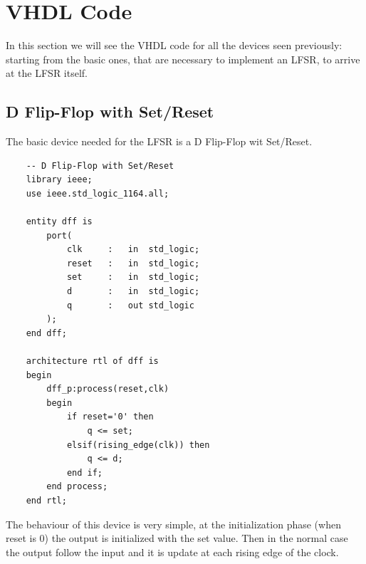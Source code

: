 \documentclass[a4paper]{report}
\begin{document}
\chapter{VHDL Code}
In this section we will see the VHDL code for all the devices seen previously: starting from the basic ones, that are necessary to implement an LFSR, to arrive at the LFSR itself.
\section{D Flip-Flop with Set/Reset}
The basic device needed for the LFSR is a D Flip-Flop wit Set/Reset.
\lstset{ %
	language=VHDL}
\begin{lstlisting}
	-- D Flip-Flop with Set/Reset
	library ieee;
	use ieee.std_logic_1164.all;
	
	entity dff is
		port(
			clk		:	in 	std_logic;
			reset	:	in 	std_logic;
			set 	:	in 	std_logic;
			d 		:	in 	std_logic;
			q 		:	out std_logic
		);
	end dff;
	
	architecture rtl of dff is
	begin
		dff_p:process(reset,clk)
		begin
			if reset='0' then
				q <= set;
			elsif(rising_edge(clk)) then
				q <= d;
			end if;
		end process;
	end rtl;
\end{lstlisting}
The behaviour of this device is very simple, at the initialization phase (when reset is 0) the output is initialized with the set value. Then in the normal case the output follow the input and it is update at each rising edge of the clock.
\end{document}
